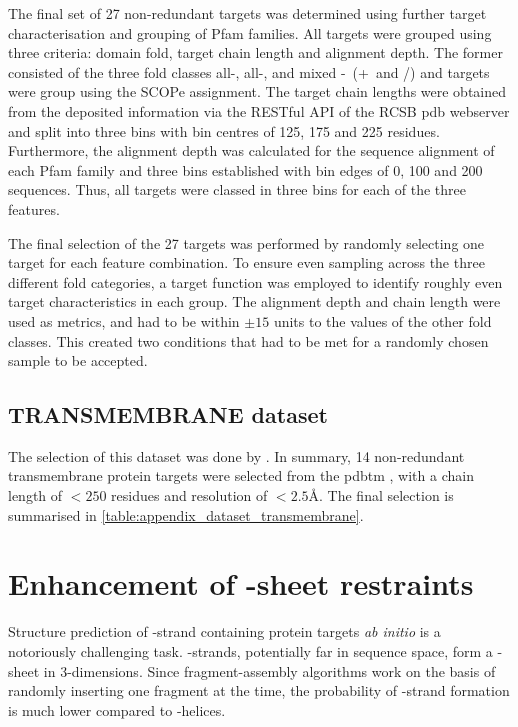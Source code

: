 The final set of 27 non-redundant targets was determined using further target characterisation and grouping of Pfam families. All targets were grouped using three criteria: domain fold, target chain length and alignment depth. The former consisted of the three fold classes all-\textalpha, all-\textbeta, and mixed \textalpha-\textbeta\ (\textalpha+\textbeta\ and \textalpha/\textbeta) and targets were group using the SCOPe assignment. The target chain lengths were obtained from the deposited information via the RESTful API of the RCSB \gls{pdb} webserver and split into three bins with bin centres of 125, 175 and 225 residues. Furthermore, the alignment depth was calculated for the sequence alignment of each Pfam family and three bins established with bin edges of 0, 100 and 200 sequences. Thus, all targets were classed in three bins for each of the three features. 

The final selection of the 27 targets was performed by randomly selecting one target for each feature combination. To ensure even sampling across the three different fold categories, a target function was employed to identify roughly even target characteristics in each group. The alignment depth and chain length were used as metrics, and had to be within $\pm15$ units to the values of the other fold classes. This created two conditions that had to be met for a randomly chosen sample to be accepted.

\subsection{TRANSMEMBRANE dataset} \label{sec:methods_dataset_transmembrane}
The selection of this dataset was done by \textcite{Thomas2017-sh}. In summary, 14 non-redundant transmembrane protein targets were selected from the \gls{pdbtm} \cite{Tusnady2005-ns}, with a chain length of $<250$ residues and resolution of $<2.5$\AA. The final selection is summarised in \cref{table:appendix_dataset_transmembrane}.

\section{Enhancement of \textbeta-sheet restraints} \label{sec:methods_bbcontacts_addition}
Structure prediction of \textbeta-strand containing protein targets \textit{ab initio} is a notoriously challenging task. \textbeta-strands, potentially far in sequence space, form a \textbeta-sheet in 3-dimensions. Since fragment-assembly algorithms work on the basis of randomly inserting one fragment at the time, the probability of \textbeta-strand formation is much lower compared to \textalpha-helices. 

